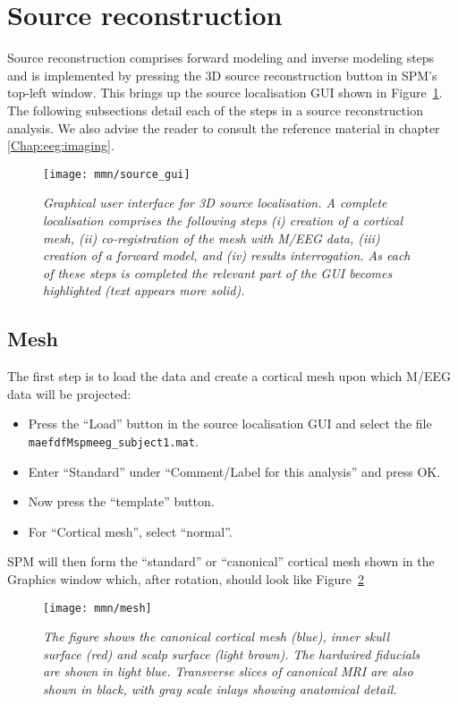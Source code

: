 \section{Source reconstruction}

Source reconstruction comprises forward modeling and inverse modeling steps and is implemented by pressing the 3D source reconstruction button in SPM's top-left window.
This brings up the source localisation GUI shown in Figure~\ref{source_gui}. The following subsections detail each of the steps in a source reconstruction analysis. We also advise the reader to consult the reference material in chapter \ref{Chap:eeg:imaging}.

\begin{figure}
\begin{center}
\texttt{[image: mmn/source\_gui]}
\caption{\em Graphical user interface for 3D source localisation. A complete localisation comprises the following steps (i) creation of a cortical mesh, (ii) co-registration of the mesh with M/EEG data, (iii) creation of a forward model, and (iv) results interrogation. As each of these steps is completed the relevant part of the GUI becomes highlighted (text appears more solid).
\label{source_gui}}
\end{center}
\end{figure}

\subsection{Mesh}
The first step is to load the data and create a cortical mesh upon which M/EEG data will be projected:
\begin{itemize}
\item{Press the ``Load'' button in the source localisation GUI and select the file \texttt{maefdfMspmeeg\_subject1.mat}.}
\item{Enter ``Standard'' under ``Comment/Label for this analysis'' and press OK.}
\item{Now press the ``template'' button.}
\item{For ``Cortical mesh'', select ``normal''.}
\end{itemize}
SPM will then form the ``standard'' or ``canonical'' cortical mesh shown in the Graphics window which, after rotation, should look like Figure~\ref{mesh}
\begin{figure}
\begin{center}
\texttt{[image: mmn/mesh]}
\caption{\em The figure shows the canonical cortical mesh (blue), inner skull surface (red) and scalp surface (light brown). The hardwired fiducials are shown in light blue. Transverse slices of canonical MRI are also shown in black, with gray scale inlays showing anatomical detail.
\label{mesh}}
\end{center}
\end{figure}

